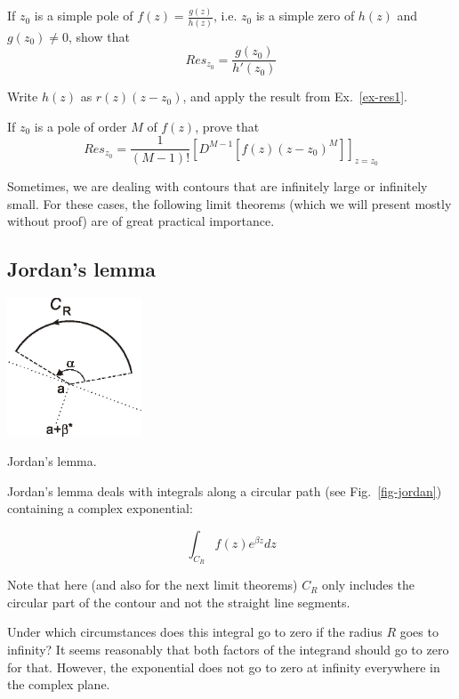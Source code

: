\begin{exer}
  If $z_0$ is a simple pole of $f(z)=\frac{g(z)}{h(z)}$, i.e. $z_0$ is a simple zero of $h(z)$ and $g(z_0) \ne 0$, show that
    $$Res_{z_0} = \frac{g(z_0)}{h'(z_0)}$$
\begin{hnt}
Write $h(z)$ as $r(z)(z-z_0)$, and apply the result from Ex.~\ref{ex-res1}.
\end{hnt}
\end{exer}

\begin{exer}
If $z_0$ is a pole of order $M$ of $f(z)$, prove that
$$Res_{z_0} = \frac{1}{(M-1)!}{\left[D^{M-1}[f(z)(z-z_0)^M]\right]}_{z=z_0}$$
\end{exer}



Sometimes, we are dealing with contours that are infinitely large or infinitely small. For these cases, the following limit theorems (which we will present mostly without proof) are of great practical importance.

\subsection*{Jordan's lemma}

\begin{marginfigure}
\centering
\includegraphics[width=4cm]{complex/figures/jordan}
\caption{Jordan's lemma.}
\label{fig-jordan}
\end{marginfigure}

Jordan's lemma deals with integrals along a circular path  (see Fig.~\ref{fig-jordan}) containing a complex exponential: 

$$ \int_{{C}_R} f(z) e^{\beta z} dz$$

Note that here (and also for the next limit theorems) ${{C}_R}$ only includes the circular part of the contour and not the straight line segments.

Under which circumstances does this integral go to zero if the radius $R$ goes to infinity? It seems reasonably that both factors of the integrand should go to zero for that. However, the exponential does not go to zero at infinity everywhere in the complex plane. 

